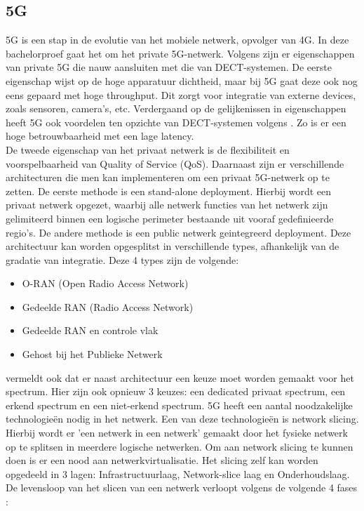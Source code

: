 \subsection{5G}
5G is een stap in de evolutie van het mobiele netwerk, opvolger van 4G. In deze bachelorproef gaat het om het private 5G-netwerk. Volgens \textcite{wen2021private} zijn er eigenschappen van private 5G die nauw aansluiten met die van DECT-systemen. De eerste eigenschap wijst op de hoge apparatuur dichtheid, maar bij 5G gaat deze ook nog eens gepaard met hoge throughput. Dit zorgt voor integratie van externe devices, zoals sensoren, camera's, etc. Verdergaand op de gelijkenissen in eigenschappen heeft 5G ook voordelen ten opzichte van DECT-systemen volgens \textcite{wen2021private}. Zo is er een hoge betrouwbaarheid met een lage latency.\\ De tweede eigenschap van het privaat netwerk is de flexibiliteit en voorspelbaarheid van Quality of Service (QoS). Daarnaast zijn er verschillende architecturen die men kan implementeren om een privaat 5G-netwerk op te zetten. De eerste methode is een stand-alone deployment. Hierbij wordt een privaat netwerk opgezet, waarbij alle netwerk functies van het netwerk zijn gelimiteerd binnen een logische perimeter bestaande uit vooraf gedefinieerde regio's. De andere methode is een public netwerk geintegreerd deployment. Deze architectuur kan worden opgesplitst in verschillende types, afhankelijk van de gradatie van integratie. Deze 4 types zijn de volgende:

\begin{itemize}
  \item O-RAN (Open Radio Access Network)
  \item Gedeelde RAN (Radio Access Network)
  \item Gedeelde RAN en controle vlak
  \item Gehost bij het Publieke Netwerk
\end{itemize}



\textcite{wen2021private} vermeldt ook dat er naast architectuur een keuze moet worden gemaakt voor het spectrum. Hier zijn ook opnieuw 3 keuzes: een dedicated privaat spectrum, een erkend spectrum en een niet-erkend spectrum. 
5G heeft een aantal noodzakelijke technologieën nodig in het netwerk. Een van deze technologieën is network slicing. Hierbij wordt er 'een netwerk in een netwerk' gemaakt door het fysieke netwerk op te splitsen in meerdere logische netwerken. Om aan network slicing te kunnen doen is er een nood aan netwerkvirtualisatie. Het slicing zelf kan worden opgedeeld in 3 lagen: Infrastructuurlaag, Network-slice laag en Onderhoudslaag. De levensloop van het slicen van een netwerk verloopt volgens de volgende 4 fases \autocite{wen2021private}:

